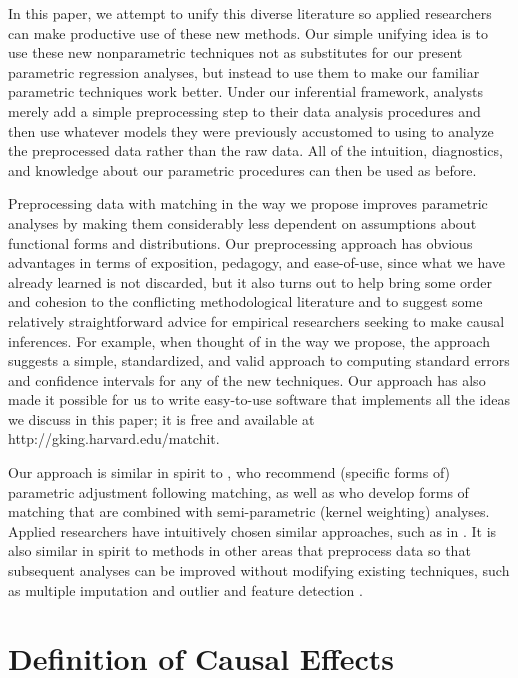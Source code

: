 \documentclass[11pt,titlepage]{article}
\begin{document}
In this paper, we attempt to unify this diverse literature so applied
researchers can make productive use of these new methods.  Our simple
unifying idea is to use these new nonparametric techniques not as
substitutes for our present parametric regression analyses, but
instead to use them to make our familiar parametric techniques work
better.  Under our inferential framework, analysts merely add a simple
preprocessing step to their data analysis procedures and then use
whatever models they were previously accustomed to using to analyze
the preprocessed data rather than the raw data.  All of the intuition,
diagnostics, and knowledge about our parametric procedures can then be
used as before.

Preprocessing data with matching in the way we propose improves
parametric analyses by making them considerably less dependent on
assumptions about functional forms and distributions.  Our
preprocessing approach has obvious advantages in terms of exposition,
pedagogy, and ease-of-use, since what we have already learned is not
discarded, but it also turns out to help bring some order and cohesion
to the conflicting methodological literature and to suggest some
relatively straightforward advice for empirical researchers seeking to
make causal inferences.  For example, when thought of in the way we
propose, the approach suggests a simple, standardized, and valid
approach to computing standard errors and confidence intervals for any
of the new techniques.  Our approach has also made it possible for us
to write easy-to-use software that implements all the ideas we discuss
in this paper; it is free and available at
http://gking.harvard.edu/matchit.

Our approach is similar in spirit to \citet{AbaImb04,RubTho00}, who
recommend (specific forms of) parametric adjustment following
matching, as well as \citet{HecIchTod98} who develop forms of matching
that are combined with semi-parametric (kernel weighting) analyses.
Applied researchers have intuitively chosen similar approaches, such as in
\citet{Rosenbaum86, GlaLevMye03}.  
It is also similar in spirit to methods in other areas that preprocess
data so that subsequent analyses can be improved without modifying
existing techniques, such as multiple imputation
\citep{Rubin87,KinHonJos01} and outlier and feature detection
\citep[][Ch.8]{Bishop95}.  

\section{Definition of Causal Effects}
\end{document}
